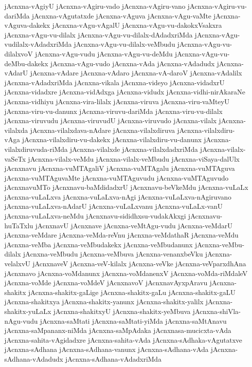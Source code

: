 {jAcnxna-vAgiyU
jAcnxna-vAgiru-vado
jAcnxna-vAgiru-vano
jAcnxna-vAgiru-vu-dariMda
jAcnxna-vAgutatxde
jAcnxna-vAguva
jAcnxna-vAgu-vaMte
jAcnxna-vAguva-dakekx
jAcnxna-vAgu-vAgalU
jAcnxna-vAgu-vu-dakokxVsakxra
jAcnxna-vAgu-vu-dilalx
jAcnxna-vAgu-vu-dilalx-dAdadxriMda
jAcnxna-vAgu-vudilalx-vAdadxriMda
jAcnxna-vAgu-vu-dilalx-veMbudu
jAcnxna-vAgu-vu-dilalxvoV
jAcnxna-vAgu-vudu
jAcnxna-vAgu-vu-deMdu
jAcnxna-vAgu-vu-deMbu-dakekx
jAcnxna-vAgu-vudo
jAcnxna-vAda
jAcnxna-vAdadudx
jAcnxna-vAdarU
jAcnxna-vAdare
jAcnxna-vAdaro
jAcnxna-vA-daroV
jAcnxna-vAdalilx
jAcnxna-vAdadxriMda
jAcnxna-vikala
jAcnxna-videyo
jAcnxna-vidadxrU
jAcnxna-vidadxre
jAcnxna-vidAdxga
jAcnxna-vidudx
jAcnxna-vidhi-nirAkaraNe
jAcnxna-vidhiyu
jAcnxna-vira-lilalx
jAcnxna-viruva
jAcnxna-viru-vaMteyU
jAcnxna-viru-vu-danunx
jAcnxna-viruvu-dariMda
jAcnxna-viru-vu-dilalx
jAcnxna-viruvudu
jAcnxna-viruvudU
jAcnxna-viruvudo
jAcnxna-vilalx
jAcnxna-vilalxda
jAcnxna-vilalxdava-nAdare
jAcnxna-vilalxdiruva
jAcnxna-vilalxdiru-vAga
jAcnxna-vilalxdiru-vu-dakekx
jAcnxna-vilalxdiru-vu-danunx
jAcnxna-vilalxdiruvuda-riMda
jAcnxna-vilalxde
jAcnxna-vilalxdadxriMda
jAcnxna-vilalx-vaSeTx
jAcnxna-vilalx-veMdu
jAcnxna-vilalx-veMbudu
jAcnxna-viSaya-dalUlx
jAcnxnavu
jAcnxna-vuMTAgaliV
jAcnxna-vuMTAgalu
jAcnxna-vuMTAguva
jAcnxna-vuMTAguvaMte
jAcnxna-vuMTAguvudu
jAcnxna-vuMTAguvudo
jAcnxnavuMTo
jAcnxnavu-baMdidadxrU
jAcnxnavu-beVkeMdu
jAcnxna-vuLaLx
jAcnxna-vuLaLxva
jAcnxna-vuLaLxva-nAgi
jAcnxna-vuLaLxva-nAgiruvano
jAcnxna-vuLaLxva-nAdarU
jAcnxna-vuLaLxvanu
jAcnxna-vuLaLx-vanU
jAcnxna-vuLaLxva-neMdu
jAcnxnavu-sididhxsu-vudakAkxgi
jAcnxnavu-huTaTxlu
jAcnxnavU
jAcnxnave
jAcnxna-veMtAgu-vudu
jAcnxna-veMdarU
jAcnxna-veMdare
jAcnxna-veMda-reVnu
jAcnxna-veMdathaR
jAcnxna-veMdu
jAcnxna-veMba
jAcnxna-veMbudakekx
jAcnxna-veMbudanunx
jAcnxna-veMbu-dilalx
jAcnxna-veMbudu
jAcnxna-veMbuva
jAcnxna-venanxbeVku
jAcnxna-velalxvU
jAcnxnaveV
jAcnxna-veV-kilalx
jAcnxna-veVke
jAcnxna-veVparxdhAna
jAcnxnavo
jAcnxna-voMdanunx
jAcnxna-voMdanenxV
jAcnxna-voMda-riMdaleV
jAcnxna-voMde
jAcnxna-voMdeV
jAcnxnavoV
jAcnxnavAyxpAravu
jAcnxna-shakitx
jAcnxna-shakitx-gaLige
jAcnxna-shakitx-gaLu
jAcnxna-shakitx-gaLU
jAcnxna-shakitxya
jAcnxna-shakitx-yanunx
jAcnxna-shakitx-yalilx
jAcnxna-shakitx-yuLaLx
jAcnxna-shakitxyU
jAcnxna-shakitx-yeMbuva
jAcnxna-shiVla-nAgu-vudu
jAcnxna-saMtati
jAcnxna-saMtati-yiMda
jAcnxna-saMtAnavu
jAcnxna-saMpananx-niMda
jAcnxna-saMpAdaka
jAcnxnasa-mucicxta-vAda
jAcnxna-sahita-vAgidadxre
jAcnxna-sahita-vAda
jAcnxna-sAdhaka-vAgutatxve
jAcnxna-sAdhana
jAcnxna-sAdhana-vanunx
jAcnxna-sAdhana-vAda
jAcnxna-sAdhana-vAdadudx
jAcnxna-sAdhana-vAdadxriMda
}
